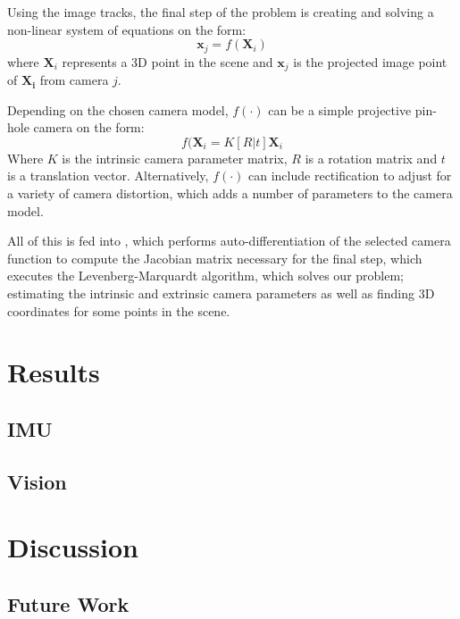 \documentclass[acmtog]{acmart}
\begin{document}
Using the image tracks, the final step of the problem is creating and solving a
non-linear system of equations on the form:
%
\begin{equation*}
  \mathbf{x}_{j} = f(\mathbf{X}_{i})
\end{equation*}
%
where $\mathbf{X}_{i}$ represents a 3D point in the scene and $\mathbf{x}_{j}$
is the projected image point of $\mathbf{X_{i}}$ from camera $j$.

Depending on the chosen camera model, $f(\cdot)$ can be a simple projective pin-hole
camera on the form:
%
\begin{equation*}
  f(\mathbf{X}_{i} =
  K [R | t] \mathbf{X}_{i}
\end{equation*}
%
Where $K$ is the intrinsic camera parameter matrix, $R$ is a rotation matrix and
$t$ is a translation vector. Alternatively, $f(\cdot)$ can include rectification to
adjust for a variety of camera distortion, which adds a number of parameters to
the camera model.

All of this is fed into \cite{ceres-software}, which performs
auto-differentiation of the selected camera function to compute the Jacobian
matrix necessary for the final step, which executes the Levenberg-Marquardt
algorithm\cite{More78}, which solves our problem; estimating the intrinsic and
extrinsic camera parameters as well as finding 3D coordinates for some points in
the scene.


\section{Results}

\subsection{IMU}


\subsection{Vision}



\section{Discussion}



\subsection{Future Work}
\end{document}
